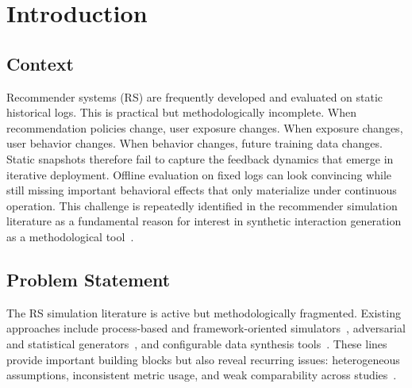 \documentclass[sigconf,nonacm]{acmart}
\begin{document}


\maketitle

\section{Introduction}
\label{sec:introduction}

\subsection{Context}
Recommender systems (RS) are frequently developed and evaluated on static
historical logs. This is practical but methodologically incomplete. When
recommendation policies change, user exposure changes. When exposure changes,
user behavior changes. When behavior changes, future training data changes.
Static snapshots therefore fail to capture the feedback dynamics that emerge
in iterative deployment. Offline evaluation on fixed logs can look convincing
while still missing important behavioral effects that only materialize under
continuous operation. This challenge is repeatedly identified in the
recommender simulation literature as a fundamental reason for interest in
synthetic interaction generation as a methodological
tool~\cite{stavinova2022survey,ekstrand2021simurec,chaney2021challenges}.

\subsection{Problem Statement}
The RS simulation literature is active but methodologically fragmented.
Existing approaches include process-based and framework-oriented
simulators~\cite{bountouridis2019siren,lucherini2021trecs,mcinerney2021accordion},
adversarial and statistical generators~\cite{zhao2021usersim,bobadilla2023ganrs},
and configurable data synthesis tools~\cite{delcarmen2017datacgencars,jakomin2018gids}.
These lines provide important building blocks but also reveal recurring
issues: heterogeneous assumptions, inconsistent metric usage, and weak
comparability across studies~\cite{stavinova2022survey,chaney2021challenges}.
\end{document}
